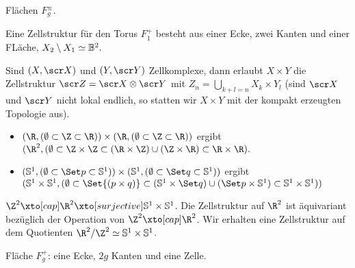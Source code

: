 \begin{ex}
    Flächen $F_g^\pm$.

    Eine Zellstruktur für den Torus $F_1^+$ besteht aus einer Ecke, zwei Kanten und einer FLäche,
    \begin{math}
        X_2 \setminus X_1 \simeq \mathbb{B}^2.
    \end{math}
\end{ex}

\begin{prop}
    Sind $(X, \scr X)$ und $(Y, \scr Y)$ Zellkomplexe, dann erlaubt $X \times Y$ die Zellstruktur $\scr Z = \scr X \otimes \scr Y$ mit
    \begin{math}
        Z_n = \bigcup_{k+l=n} X_k \times Y_l
    \end{math}
    (sind $\scr X$ und $\scr Y$ nicht lokal endlich, so statten wir $X \times Y$ mit der kompakt erzeugten Topologie aus).
\end{prop}

\begin{ex}
    \begin{itemize}
        \item
            $(\R, (\emptyset \subset \Z \subset \R)) \times (\R, (\emptyset \subset \Z \subset \R))$ ergibt
            \begin{math}
                (\R^2, (\emptyset \subset \Z \times \Z \subset (\R \times \Z) \cup (\Z \times \R) \subset \R \times \R).
            \end{math}
        \item
            $(\S^1, (\emptyset \subset \Set p \subset \S^1)) \times (\S^1, (\emptyset \subset \Set q \subset \S^1))$ ergibt
            \begin{math}
                (\S^1 \times \S^1, (\emptyset \subset \Set{(p\times q)} \subset (\S^1 \times \Set q) \cup (\Set p \times \S^1) \subset \S^1 \times \S^1))
            \end{math}
    \end{itemize}
\end{ex}

\begin{nt}
    $\Z^2 \xto[cap] \R^2 \xto[surjective] \S^1 \times \S^1$.
    Die Zellstruktur auf $\R^2$ ist äquivariant bezüglich der Operation von $\Z^2 \xto[cap] \R^2$.
    Wir erhalten eine Zellstruktur auf dem Quotienten $\R^2 / \Z^2 \homeomorphic \S^1 \times \S^1$.
\end{nt}

\begin{ex}
    Fläche $F_g^+$: eine Ecke, $2g$ Kanten und eine Zelle.
\end{ex}

